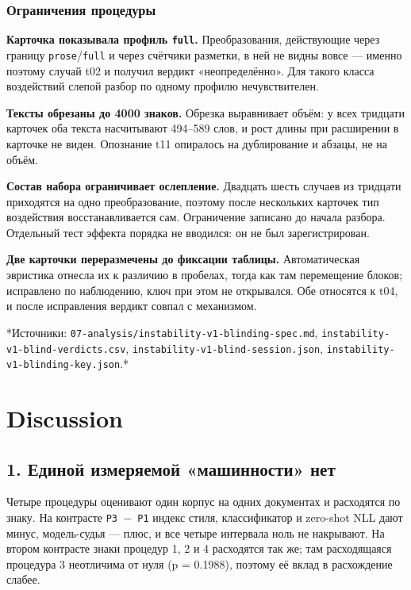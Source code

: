 \documentclass[11pt,a4paper]{article}
\renewcommand{\_}{\textunderscore\allowbreak}
\begin{document}
\subsubsection{Ограничения процедуры}

\textbf{Карточка показывала профиль \texttt{full}.} Преобразования, действующие через границу
\texttt{prose}/\texttt{full} и через счётчики разметки, в ней не видны вовсе — именно поэтому
случай t02 и получил вердикт «неопределённо». Для такого класса воздействий
слепой разбор по одному профилю нечувствителен.

\textbf{Тексты обрезаны до 4000 знаков.} Обрезка выравнивает объём: у всех тридцати
карточек оба текста насчитывают 494–589 слов, и рост длины при расширении в
карточке не виден. Опознание t11 опиралось на дублирование и абзацы, не на объём.

\textbf{Состав набора ограничивает ослепление.} Двадцать шесть случаев из тридцати
приходятся на одно преобразование, поэтому после нескольких карточек тип
воздействия восстанавливается сам. Ограничение записано до начала разбора.
Отдельный тест эффекта порядка не вводился: он не был зарегистрирован.

\textbf{Две карточки переразмечены до фиксации таблицы.} Автоматическая эвристика
отнесла их к различию в пробелах, тогда как там перемещение блоков; исправлено по
наблюдению, ключ при этом не открывался. Обе относятся к t04, и после исправления
вердикт совпал с механизмом.

*Источники: \texttt{07-\allowbreak{}analysis/instability-\allowbreak{}v1-\allowbreak{}blinding-\allowbreak{}spec.md},
\texttt{instability-\allowbreak{}v1-\allowbreak{}blind-\allowbreak{}verdicts.csv}, \texttt{instability-\allowbreak{}v1-\allowbreak{}blind-\allowbreak{}session.json},
\texttt{instability-\allowbreak{}v1-\allowbreak{}blinding-\allowbreak{}key.json}.*

\section{Discussion}

\subsection{1. Единой измеряемой «машинности» нет}

Четыре процедуры оценивают один корпус на одних документах и расходятся по знаку.
На контрасте \texttt{P3 $-$ P1} индекс стиля, классификатор и zero-shot NLL дают минус,
модель-судья — плюс, и все четыре интервала ноль не накрывают. На втором
контрасте знаки процедур 1, 2 и 4 расходятся так же; там расходящаяся
процедура 3 неотличима от нуля (p = 0.1988), поэтому её вклад в расхождение
слабее.
\end{document}
